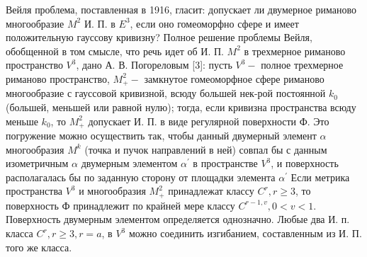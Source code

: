 \documentclass[10pt]{article}
\begin{document}
Вейля проблема, поставленная в 1916, гласит: допускает ли двумерное риманово многообразие $M^{2}$ И. П. в $E^{3}$, если оно гомеоморфно сфере и имеет положительную гауссову кривизну? Полное решение проблемы Вейля, обобщенной в том смысле, что речь идет об И. П. $M^{2}$ в трехмерное риманово пространство $V^{3}$, дано А. В. Погореловым [3]: пусть $V^{3}-$ полное трехмерное риманово пространство, $M_{+}^{2}-$ замкнутое гомеоморфное сфере риманово многообразие с гауссовой кривизной, всюду большей нек-рой постоянной $k_{0}$ (большей, меньшей или равной нулю); тогда, если кривизна пространства всюду меньше $k_{0}$, то $M_{+}^{2}$ допускает И. П. в виде регулярной поверхности Ф. Это погружение можно осуществить так, чтобы данный двумерный элемент $\alpha$ многообразия $M^{k}$ (точка и пучок направлений в ней) совпал бы с данным изометричным $\alpha$ двумерным элементом $\alpha^{\prime}$ в пространстве $V^{3}$, и поверхность располагалась бы по заданную сторону от площадки элемента $\alpha^{\prime}$ Если метрика пространства $V^{3}$ и многообразия $M_{+}^{2}$ принадлежат классу $C^{r}, r \geqslant 3$, то поверхность Ф принадлежит по крайней мере классу $C^{r-1, v}, 0<v<1$. Поверхность двумерным элементом определяется однозначно. Любые два И. п. класса $C^{r}, r \geqslant 3, r=a$, в $V^{3}$ можно соединить изгибанием, составленным из И. П. того же класса.
\end{document}

